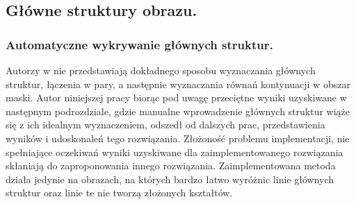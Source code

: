 \documentclass[12pt, twoside, openany]{report}
\theoremstyle{definition}
\begin{document}
\subsection{Główne struktury obrazu.}
\subsubsection{Automatyczne wykrywanie głównych struktur.}
Autorzy w \cite{SalientStrucTexProp} nie przedstawiają dokładnego sposobu wyznaczania głównych struktur, łączenia w pary, a następnie wyznaczania równań kontynuacji w obszar maski. Autor niniejszej pracy biorąc pod uwagę przeciętne wyniki uzyskiwane w następnym podrozdziale, gdzie manualne wprowadzenie głównych struktur wiąże się z ich idealnym wyznaczeniem, odszedł od dalszych prac, przedstawienia wyników i udoskonaleń tego rozwiązania.
Złożoność problemu implementacji, nie spełniające oczekiwań wyniki uzyskiwane dla zaimplementowanego rozwiązania skłaniają do zaproponowania innego rozwiązania. Zaimplementowana metoda działa jedynie na obrazach, na których bardzo łatwo wyróżnic linie głównych struktur oraz linie te nie tworzą złożonych kształtów.
\end{document}
